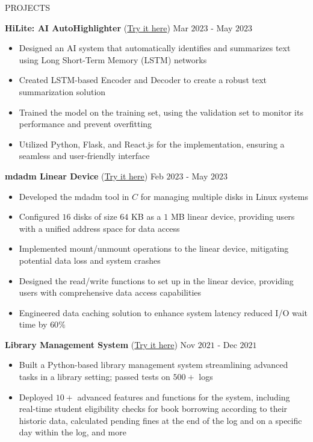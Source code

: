 \documentclass{resume} %
\begin{document}
\begin{rSection}{PROJECTS}

{\bf HiLite: AI AutoHighlighter }{(\href{https://github.com/harshitjain17/HiLite-AIAutoHighlighter}{Try it here})} \hfill Mar $2023$ - May $2023$
\begin{itemize}[itemsep = -4pt]
    \item Designed an AI system that automatically identifies and summarizes text using Long Short-Term Memory (LSTM) networks
    \item Created LSTM-based Encoder and Decoder to create a robust text summarization solution
    \item Trained the model on the training set, using the validation set to monitor its performance and prevent overfitting
    \item Utilized Python, Flask, and React.js for the implementation, ensuring a seamless and user-friendly interface
\end{itemize}

{\bf mdadm Linear Device }{(\href{https://github.com/harshitjain17/mdadm-Linear-Device}{Try it here})} \hfill Feb $2023$ - May $2023$
\begin{itemize}[itemsep = -4pt]
    \item Developed the mdadm tool in $C$ for managing multiple disks in Linux systems
    \item Configured $16$ disks of size $64$ KB as a $1$ MB linear device, providing users with a unified address space for data access
    \item Implemented mount/unmount operations to the linear device, mitigating potential data loss and system crashes
    \item Designed the read/write functions to set up in the linear device, providing users with comprehensive data access capabilities
    \item Engineered data caching solution to enhance system latency reduced I/O wait time by $60\%$
\end{itemize}

{\bf Library Management System }{(\href{https://github.com/harshitjain17/Library-Management-System}{Try it here})} \hfill Nov $2021$ - Dec $2021$
\begin{itemize}[itemsep = -4pt]
    \item Built a Python-based library management system streamlining advanced tasks in a library setting; passed tests on $500+$ logs
    \item Deployed $10+$ advanced features and functions for the system, including real-time student eligibility checks for book borrowing according to their historic data, calculated pending fines at the end of the log and on a specific day within the log, and more
\end{itemize}

\end{rSection} 
\end{document}
